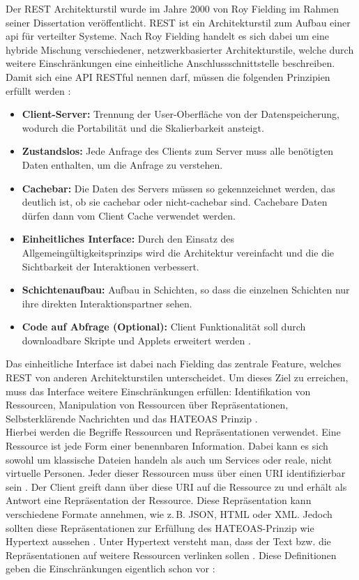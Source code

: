 Der \ac{REST} Architekturstil wurde im Jahre 2000 von Roy Fielding im Rahmen seiner Dissertation veröffentlicht. \ac{REST} ist ein Architekturstil zum Aufbau einer \ac{api} für verteilter Systeme. Nach Roy Fielding handelt es sich dabei um eine hybride Mischung verschiedener, netzwerkbasierter Architekturstile, welche durch weitere Einschränkungen eine einheitliche Anschlussschnittstelle beschreiben. Damit sich eine API RESTful nennen darf, müssen die folgenden Prinzipien erfüllt werden \parencite{Fielding2000}:

\begin{itemize}
\item \textbf{Client-Server:} Trennung der User-Oberfläche von der Datenspeicherung, wodurch die Portabilität und die Skalierbarkeit ansteigt.
\item \textbf{Zustandslos:} Jede Anfrage des Clients zum Server muss alle benötigten Daten enthalten, um die Anfrage zu verstehen.
\item \textbf{Cachebar:} Die Daten des Servers müssen so gekennzeichnet werden, das deutlich ist, ob sie cachebar oder nicht-cachebar sind. Cachebare Daten dürfen dann vom Client Cache verwendet werden.
\item \textbf{Einheitliches Interface:} Durch den Einsatz des Allgemeingültigkeitsprinzips wird die Architektur vereinfacht und die die Sichtbarkeit der Interaktionen verbessert.
\item \textbf{Schichtenaufbau:} Aufbau in Schichten, so dass die einzelnen Schichten nur ihre direkten Interaktionspartner sehen.
\item \textbf{Code auf Abfrage (Optional):} Client Funktionalität soll durch downloadbare Skripte und Applets erweitert werden .
\end{itemize}

Das einheitliche Interface ist dabei nach Fielding das zentrale Feature, welches \ac{REST} von anderen Architekturstilen unterscheidet. Um dieses Ziel zu erreichen, muss das Interface weitere Einschränkungen erfüllen: Identifikation von Ressourcen, Manipulation von Ressourcen über Repräsentationen, Selbsterklärende Nachrichten und das \ac{HATEOAS} Prinzip \parencite{Fielding2000}.\\
Hierbei werden die Begriffe Ressourcen und Repräsentationen verwendet. Eine Ressource ist jede Form einer benennbaren Information. Dabei kann es sich sowohl um klassische Dateien handeln als auch um Services oder reale, nicht virtuelle Personen. Jeder dieser Ressourcen muss über einen \ac{URI} identifizierbar sein \parencite{Spichale2019}. Der Client greift dann über diese URI auf die Ressource zu und erhält als Antwort eine Repräsentation der Ressource. Diese Repräsentation kann verschiedene Formate annehmen, wie z.\,B. JSON, HTML oder XML. Jedoch sollten diese Repräsentationen zur Erfüllung des \ac{HATEOAS}-Prinzip wie Hypertext  aussehen \parencite{Fielding2008}. Unter Hypertext versteht man, dass der Text bzw. die Repräsentationen auf weitere Ressourcen verlinken sollen \parencite{Fielding2009}.  Diese Definitionen geben die Einschränkungen eigentlich schon vor \parencite{Fielding2000}:

